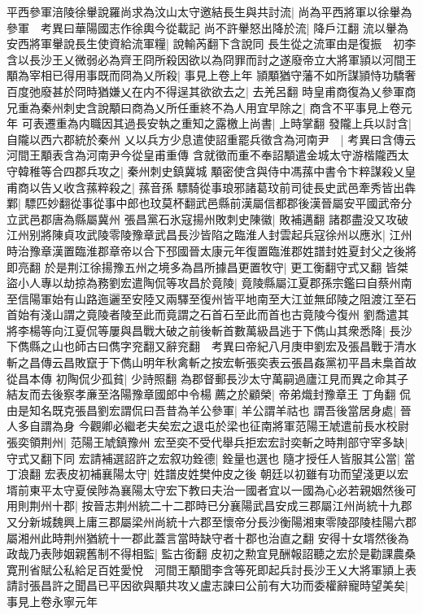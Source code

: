 平西參軍涪陵徐轝說羅尚求為汶山太守邀結長生與共討流|{
	尚為平西將軍以徐轝為參軍　考異曰華陽國志作徐輿今從載記}
尚不許轝怒出降於流|{
	降戶江翻}
流以轝為安西將軍轝說長生使資給流軍糧|{
	說輸芮翻下含說同}
長生從之流軍由是復振　初李含以長沙王乂微弱必為齊王冏所殺因欲以為冏罪而討之遂廢帝立大將軍頴以河間王顒為宰相已得用事既而冏為乂所殺|{
	事見上卷上年}
頴顒猶守藩不如所謀頴恃功驕奢百度弛廢甚於冏時猶嫌乂在内不得逞其欲欲去之|{
	去羌呂翻}
時皇甫商復為乂參軍商兄重為秦州刺史含說顒曰商為乂所任重終不為人用宜早除之|{
	商含不平事見上卷元年}
可表遷重為内職因其過長安執之重知之露檄上尚書|{
	上時掌翻}
發隴上兵以討含|{
	自隴以西六郡統於秦州}
乂以兵方少息遣使詔重罷兵徵含為河南尹　|{
	考異曰含傳云河間王顒表含為河南尹今從皇甫重傳}
含就徵而重不奉詔顒遣金城太守游楷隴西太守韓稚等合四郡兵攻之|{
	秦州刺史鎮冀城}
顒密使含與侍中馮蓀中書令卞粹謀殺乂皇甫商以告乂收含蓀粹殺之|{
	蓀音孫}
驃騎從事琅邪諸葛玟前司徒長史武邑牽秀皆出犇鄴|{
	驃匹妙翻從事從事中郎也玟莫杯翻武邑縣前漢屬信都郡後漢晉屬安平國武帝分立武邑郡唐為縣屬冀州}
張昌黨石氷寇揚州敗刺史陳徽|{
	敗補邁翻}
諸郡盡没又攻破江州别將陳貞攻武陵零陵豫章武昌長沙皆陷之臨淮人封雲起兵寇徐州以應氷|{
	江州時治豫章漢置臨淮郡章帝以合下邳國晉太康元年復置臨淮郡姓譜封姓夏封父之後將即亮翻}
於是荆江徐揚豫五州之境多為昌所據昌更置牧守|{
	更工衡翻守式又翻}
皆桀盜小人專以劫掠為務劉宏遣陶侃等攻昌於竟陵|{
	竟陵縣屬江夏郡孫宗鑑曰自蔡州南至信陽軍始有山路迤邐至安陸又兩驛至復州皆平地南至大江並無邱陵之阻渡江至石首始有淺山謂之竟陵者陵至此而竟謂之石首石至此而首也古竟陵今復州}
劉喬遣其將李楊等向江夏侃等屢與昌戰大破之前後斬首數萬級昌逃于下儁山其衆悉降|{
	長沙下儁縣之山也師古曰儁字兖翻又辭兖翻　考異曰帝紀八月庚申劉宏及張昌戰于清水斬之昌傳云昌敗竄于下儁山明年秋禽斬之按宏斬張奕表云張昌姦黨初平昌未梟首故從昌本傳}
初陶侃少孤貧|{
	少詩照翻}
為郡督郵長沙太守萬嗣過廬江見而異之命其子結友而去後察孝亷至洛陽豫章國郎中令楊薦之於顧榮|{
	帝弟熾封豫章王丁角翻}
侃由是知名既克張昌劉宏謂侃曰吾昔為羊公參軍|{
	羊公謂羊祜也}
謂吾後當居身處|{
	晉人多自謂為身}
今觀卿必繼老夫矣宏之退屯於梁也征南將軍范陽王虓遣前長水校尉張奕領荆州|{
	范陽王虓鎮豫州}
宏至奕不受代舉兵拒宏宏討奕斬之時荆部守宰多缺|{
	守式又翻下同}
宏請補選詔許之宏叙功銓德|{
	銓量也選也}
隨才授任人皆服其公當|{
	當丁浪翻}
宏表皮初補襄陽太守|{
	姓譜皮姓樊仲皮之後}
朝廷以初雖有功而望淺更以宏壻前東平太守夏侯陟為襄陽太守宏下教曰夫治一國者宜以一國為心必若親姻然後可用則荆州十郡|{
	按晉志荆州統二十二郡時已分襄陽武昌安成三郡屬江州尚統十九郡又分新城魏興上庸三郡屬梁州尚統十六郡至懷帝分長沙衡陽湘東零陵邵陵桂陽六郡屬湘州此時荆州猶統十一郡此蓋言當時缺守者十郡也治直之翻}
安得十女壻然後為政哉乃表陟姻親舊制不得相監|{
	監古銜翻}
皮初之勲宜見酬報詔聽之宏於是勸課農桑寛刑省賦公私給足百姓愛悅　河間王顒聞李含等死即起兵討長沙王乂大將軍頴上表請討張昌許之聞昌已平因欲與顒共攻乂盧志諫曰公前有大功而委權辭寵時望美矣|{
	事見上卷永寧元年}
